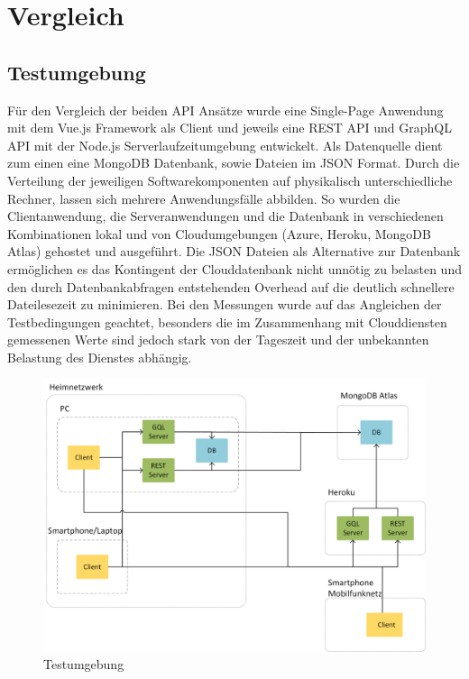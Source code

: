 \chapter{Vergleich}
\section{Testumgebung}
Für den Vergleich der beiden API Ansätze wurde eine Single-Page Anwendung mit dem Vue.js Framework als Client und jeweils eine REST API und GraphQL API mit der Node.js Serverlaufzeitumgebung entwickelt.
Als Datenquelle dient zum einen eine MongoDB Datenbank, sowie Dateien im JSON Format.
Durch die Verteilung der jeweiligen Softwarekomponenten auf physikalisch unterschiedliche Rechner, lassen sich mehrere Anwendungsfälle abbilden.
So wurden die Clientanwendung, die Serveranwendungen und die Datenbank in verschiedenen Kombinationen lokal und von Cloudumgebungen (Azure, Heroku, MongoDB Atlas) gehostet und ausgeführt.
Die JSON Dateien als Alternative zur Datenbank ermöglichen es das Kontingent der Clouddatenbank nicht unnötig zu belasten und den durch Datenbankabfragen entstehenden Overhead auf die deutlich schnellere Dateilesezeit zu minimieren.
Bei den Messungen wurde auf das Angleichen der Testbedingungen geachtet, besonders die im Zusammenhang mit Clouddiensten gemessenen Werte sind jedoch stark von der Tageszeit und der unbekannten Belastung des Dienstes abhängig.
\begin{figure}[h]
  \centering
  \includegraphics[width=\linewidth]{../Kapitel/Grafiken/netzwerk.png}
  \caption{Testumgebung}
  \label{img:REST-diss}
\end{figure}
